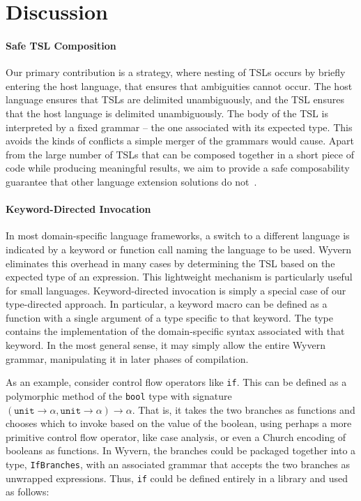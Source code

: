
\section{Discussion}\label{s:discussion}

\paragraph{Safe TSL Composition}

Our primary contribution is a strategy, where nesting of TSLs occurs by briefly entering the host language, that ensures that ambiguities cannot occur. The host language ensures that TSLs are delimited unambiguously, and the TSL ensures that the host language is delimited unambiguously. The body of the TSL is interpreted by a fixed grammar -- the one associated with its expected type. This avoids the kinds of conflicts a simple merger of the grammars would cause.
Apart from the large number of TSLs that can be composed together in a short
piece of code while producing meaningful results, we aim to provide a safe
composability guarantee that other language extension solutions do not~\cite{Erdweg:2013:FEL:2517208.2517210,krahn2008monticore}.

\paragraph{Keyword-Directed Invocation}

In most domain-specific language frameworks, a switch to a different language is indicated by a keyword or function call naming the language to be used. Wyvern eliminates this overhead in many cases by determining the TSL based on the expected type of an expression. This lightweight mechanism is particularly useful for small languages.
Keyword-directed invocation is simply a special case of our type-directed approach. In particular, a keyword macro can be defined as a function with a single argument of a type specific to that keyword. The type contains the implementation of the domain-specific syntax associated with that keyword. In the most general sense, it may simply allow the entire Wyvern
grammar, manipulating it in later phases of compilation. 

As an example, consider control flow operators like \verb|if|. This can be defined as a polymorphic method of the \verb|bool| type with signature $(\texttt{unit} \rightarrow \alpha, \texttt{unit} \rightarrow \alpha) \rightarrow \alpha$. That is, it takes the two branches as functions and chooses which to invoke based on the value of the boolean, using perhaps a more primitive control flow operator, like case analysis, or even a Church encoding of booleans as functions. In Wyvern, the branches could be packaged together into a type, \verb|IfBranches|, with an associated grammar that accepts the two branches as unwrapped expressions. Thus, \verb|if| could be defined entirely in a library and used as follows: 

